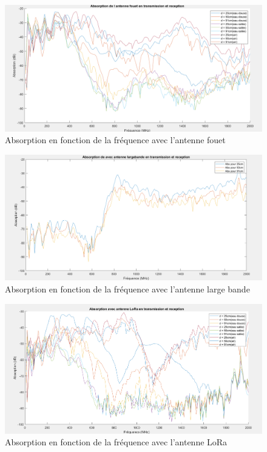 \documentclass{article}
\begin{document}
\begin{figure}[H]
    \caption{Absorption en fonction de la fréquence avec l'antenne fouet}
    \includegraphics[scale=0.4]{images/abs_fouet.PNG}
    \centering
\end{figure}

\begin{figure}[H]
    \caption{Absorption en fonction de la fréquence avec l'antenne large bande}
    \includegraphics[scale=0.4]{images/abs_large.PNG}
    \centering
\end{figure}

\begin{figure}[H]
    \caption{Absorption en fonction de la fréquence avec l'antenne LoRa}
    \includegraphics[scale=0.4]{images/abs_lora.PNG}
    \centering
\end{figure}
\end{document}
